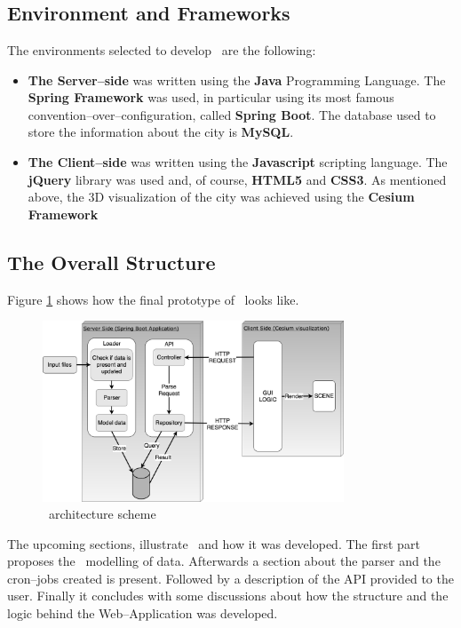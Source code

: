 \section{\applicationName} \label{projectDesign}
\subsection{Environment and Frameworks}
The environments selected to develop \applicationName\ are the following:
\begin{itemize}
	\item {\bf The Server--side} was written using the {\bf Java} Programming Language. The {\bf Spring Framework} was used, in particular using its most famous convention--over--configuration, called {\bf Spring Boot}. The database used to store the information about the city is {\bf MySQL}.
	\item {\bf The Client--side} was written using the {\bf Javascript} scripting language. The {\bf jQuery} library was used and, of course, {\bf HTML5} and {\bf CSS3}. As mentioned above, the 3D visualization of the city was achieved using the {\bf Cesium Framework}
\end{itemize}

\subsection{The Overall Structure}
Figure \ref{fig:project_structure} shows how the final prototype of \applicationName\ looks like.
\begin{figure}[H]
\centering
\includegraphics[width=0.8\textwidth]{chapter3/images/project_structure}
\caption{\applicationName\ architecture scheme}
\label{fig:project_structure}
\end{figure}
The upcoming sections, illustrate \applicationName\ and how it was developed. The first part proposes the \applicationName\ modelling of data. Afterwards a section about the parser and the cron--jobs created is present. Followed by a description of the API provided to the user. Finally it concludes with some discussions about how the structure and the logic behind the Web--Application was developed.
